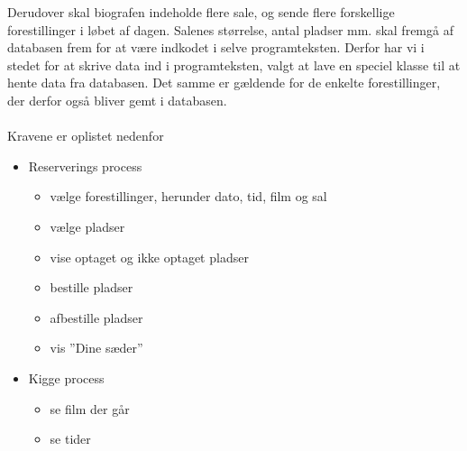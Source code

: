 \documentclass[final]{report}
\begin{document}
Derudover skal biografen indeholde flere sale, og sende flere forskellige forestillinger i løbet af dagen. Salenes størrelse, antal pladser mm. skal fremgå af databasen frem for at være indkodet i selve programteksten. Derfor har vi i stedet for at skrive data ind i programteksten, valgt at lave en speciel klasse til at hente data fra databasen. Det samme er gældende for de enkelte forestillinger, der derfor også bliver gemt i databasen.
\\
\\
Kravene er oplistet nedenfor

\begin{itemize}
\item Reserverings process

\begin{itemize}
\item vælge forestillinger, herunder dato, tid, film og sal
\item vælge pladser
\item vise optaget og ikke optaget pladser
\item bestille pladser
\item afbestille pladser
\item vis ''Dine sæder''
\end{itemize}

\item Kigge process
\begin{itemize}
\item se film der går
\item se tider

\end{itemize}
\end{itemize}
\end{document}
